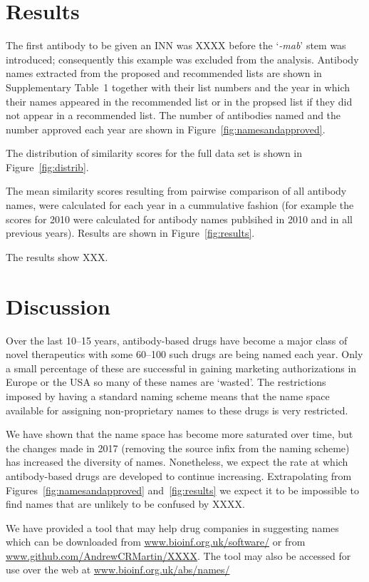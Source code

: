 \documentclass{article}
\newcommand{\eg}[1]{`\emph{#1}'}
\begin{document}
\section{Results}
The first antibody to be given an INN was XXXX before the \eg{-mab}
stem was introduced; consequently this example was excluded from the
analysis. Antibody names extracted from the proposed and recommended
lists are shown in Supplementary Table~1 together with their list
numbers and the year in which their names appeared in the recommended
list or in the propsed list if they did not appear in a recommended
list. The number of antibodies named and the number approved each year
are shown in Figure~\ref{fig:namesandapproved}.

The distribution of similarity scores for the full data set is shown in
Figure~\ref{fig:distrib}. 

The mean similarity scores resulting from pairwise comparison of all
antibody names, were calculated for each year in a cummulative fashion
(for example the scores for 2010 were calculated for antibody names
publsihed in 2010 and in all previous years). Results are shown in
Figure~\ref{fig:results}. 

The results show XXX.

\section{Discussion}
Over the last 10--15 years, antibody-based drugs have become a major
class of novel therapeutics with some 60--100 such drugs are being
named each year. Only a small percentage of these are successful in
gaining marketing authorizations in Europe or the USA so many of these
names are `wasted'. The restrictions imposed by having a standard
naming scheme means that the name space available for assigning
non-proprietary names to these drugs is very restricted.

We have shown that the name space has become more saturated over time,
but the changes made in 2017 (removing the source infix from the
naming scheme) has increased the diversity of names. Nonetheless, we
expect the rate at which antibody-based drugs are developed to
continue increasing. Extrapolating from
Figures~\ref{fig:namesandapproved} and~\ref{fig:results} we expect it
to be impossible to find names that are unlikely to be confused by
XXXX.

We have provided a tool that may help drug companies in suggesting
names which can be downloaded from \url{www.bioinf.org.uk/software/}
or from \url{www.github.com/AndrewCRMartin/XXXX}. The tool may also be
accessed for use over the web at \url{www.bioinf.org.uk/abs/names/}



\end{document}
